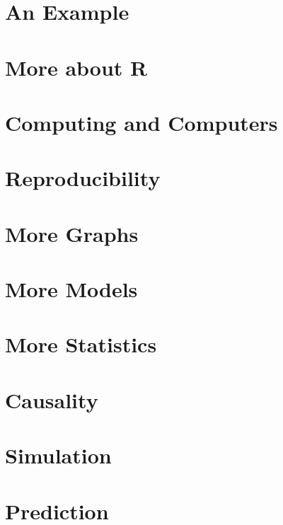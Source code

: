\documentclass[
]{article}
\theoremstyle{definition}
\theoremstyle{definition}
\theoremstyle{definition}
\theoremstyle{definition}
\theoremstyle{remark}
\begin{document}
\hypertarget{an-example}{%
\section{An Example}\label{an-example}}

\hypertarget{more-about-r}{%
\section{More about R}\label{more-about-r}}

\hypertarget{computing-and-computers}{%
\section{Computing and Computers}\label{computing-and-computers}}

\hypertarget{reproducibility-1}{%
\section{Reproducibility}\label{reproducibility-1}}

\hypertarget{more-graphs}{%
\section{More Graphs}\label{more-graphs}}

\hypertarget{more-models}{%
\section{More Models}\label{more-models}}

\hypertarget{more-statistics}{%
\section{More Statistics}\label{more-statistics}}

\hypertarget{causality}{%
\section{Causality}\label{causality}}

\hypertarget{simulation}{%
\section{Simulation}\label{simulation}}

\hypertarget{prediction}{%
\section{Prediction}\label{prediction}}
\end{document}
